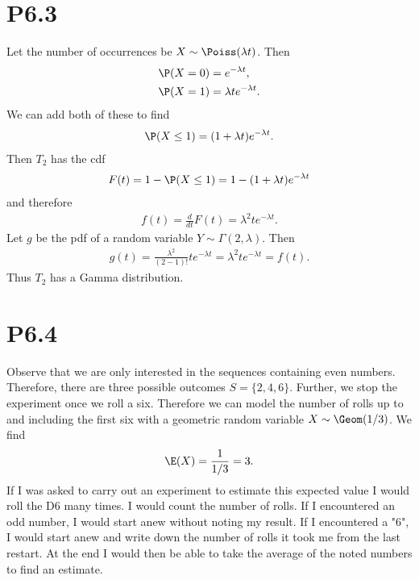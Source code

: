 \documentclass{article}
\begin{document}
\section*{P6.3}


Let the number of occurrences be $X\sim\Poiss(\lambda t)$. Then
\begin{align*}
  \P(X=0) & =e^{-\lambda t},          \\
  \P(X=1) & =\lambda te^{-\lambda t}.
\end{align*}
We can add both of these to find
\begin{align*}
  \P(X\leq 1) = (1+\lambda t)e^{-\lambda t}.
\end{align*}
Then $T_2$ has the cdf
\begin{align*}
  F(t) = 1 - \P(X\leq 1) = 1-(1+\lambda t)e^{-\lambda t}
\end{align*}
and therefore
\begin{align*}
  f(t) = \frac{d}{dt}F(t) = \lambda^2te^{-\lambda t}.
\end{align*}
Let $g$ be the pdf of a random variable $Y\sim\Gamma(2,\lambda)$. Then
\begin{align*}
  g(t) = \frac{\lambda^2}{(2-1)!}te^{-\lambda t} = \lambda^2te^{-\lambda t} = f(t).
\end{align*}
Thus $T_2$ has a Gamma distribution.


\section*{P6.4}


Observe that we are only interested in the sequences containing even numbers.
Therefore, there are three possible outcomes $S=\{2,4,6\}$. Further,
we stop the experiment once we roll a six. Therefore we can model the
number of rolls up to and including the first six with a geometric random
variable $X\sim\Geom(1/3)$. We find
\begin{align*}
  \E(X)=\frac{1}{1/3} = 3.
\end{align*}
If I was asked to carry out an experiment to estimate this expected value
I would roll the D6 many times. I would count the number of rolls. If I
encountered an odd number, I would start anew without noting my result.
If I encountered a "6", I would start anew and write down the number of
rolls it took me from the last restart. At the end I would then be able
to take the average of the noted numbers to find an estimate.
\end{document}
